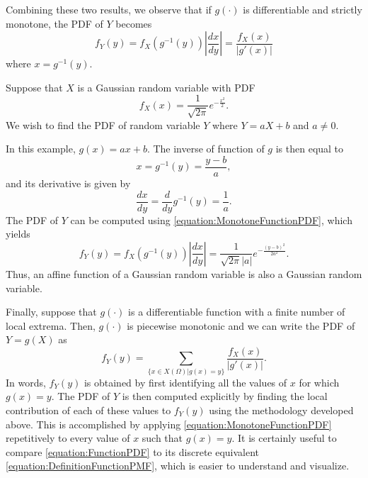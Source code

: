 Combining these two results, we observe that if $g(\cdot)$ is differentiable and strictly monotone, the PDF of $Y$ becomes
\begin{equation} \label{equation:MonotoneFunctionPDF}
f_Y (y) = f_X \left( g^{-1} (y) \right) \left| \frac{dx}{dy} \right|
= \frac{f_X (x)}{\left| g'(x) \right|}
\end{equation}
where $x = g^{-1}(y)$.

\begin{example}
Suppose that $X$ is a Gaussian random variable with PDF
\begin{equation*}
f_X(x) = \frac{1}{\sqrt{2 \pi}} e^{- \frac{x^2}{2}} .
\end{equation*}
We wish to find the PDF of random variable $Y$ where $Y = a X + b$ and $a \neq 0$.

In this example, $g(x) = ax + b$.
The inverse of function of $g$ is then equal to
\begin{equation*}
x = g^{-1} (y) = \frac{y - b}{a} ,
\end{equation*}
and its derivative is given by
\begin{equation*}
\frac{dx}{dy} = \frac{d}{dy} g^{-1}(y) = \frac{1}{a} .
\end{equation*}
The PDF of $Y$ can be computed using \eqref{equation:MonotoneFunctionPDF}, which yields
\begin{equation*}
f_Y(y) = f_X \left( g^{-1} (y) \right) \left| \frac{dx}{dy} \right|
= \frac{1}{\sqrt{2 \pi} |a|} e^{- \frac{(y-b)^2}{2 a^2} }.
\end{equation*}
Thus, an affine function of a Gaussian random variable is also a Gaussian random variable.
\end{example}

Finally, suppose that $g(\cdot)$ is a differentiable function with a finite number of local extrema.
Then, $g(\cdot)$ is piecewise monotonic and we can write the PDF of $Y= g(X)$ as
\begin{equation} \label{equation:FunctionPDF}
f_Y (y) = \sum_{\{ x \in X(\Omega) | g(x) = y\}}
\frac{f_X (x)}{\left| g'(x) \right|} .
\end{equation}
In words, $f_Y (y)$ is obtained by first identifying all the values of $x$ for which $g(x) = y$.
The PDF of $Y$ is then computed explicitly by finding the local contribution of each of these values to $f_Y(y)$ using the methodology developed above.
This is accomplished by applying \eqref{equation:MonotoneFunctionPDF} repetitively to every value of $x$ such that $g(x) = y$.
It is certainly useful to compare \eqref{equation:FunctionPDF} to its discrete equivalent \eqref{equation:DefinitionFunctionPMF}, which is easier to understand and visualize.

